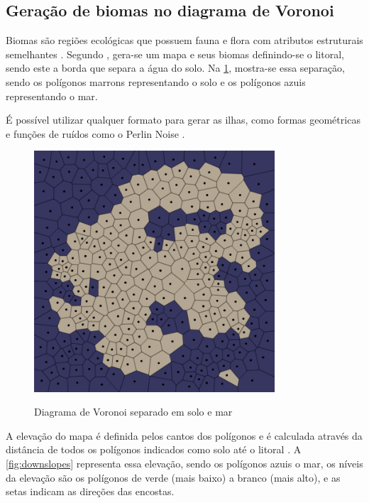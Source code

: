 \subsection{Geração de biomas no diagrama de Voronoi}
\label{sec:geracao_procedural_biomas}

Biomas são regiões ecológicas que possuem fauna e flora com atributos estruturais semelhantes \cite{maestrovirtuale}. Segundo , gera-se um mapa e seus biomas definindo-se o litoral, sendo este a borda que separa a água do solo. Na \cref{fig:voronoi-land-water}, mostra-se essa separação, sendo os polígonos marrons representando o solo e os polígonos azuis representando o mar.

É possível utilizar qualquer formato para gerar as ilhas, como formas geométricas e funções de ruídos como o Perlin Noise \cite{amitp2010}.

\begin{figure}[ht]
	\caption{Diagrama de Voronoi separado em solo e mar}
	\centering %
	\includegraphics[width=0.8\textwidth]{figures/voronoi-land-water.png} %
	\label{fig:voronoi-land-water}
\end{figure}

A elevação do mapa é definida pelos cantos dos polígonos e é calculada através da distância de todos os polígonos indicados como solo até o litoral \cite{amitp2010}. A \cref{fig:downslopes} representa essa elevação, sendo os polígonos azuis o mar, os níveis da elevação são os polígonos de verde (mais baixo) a branco (mais alto), e as setas indicam as direções das encostas.

